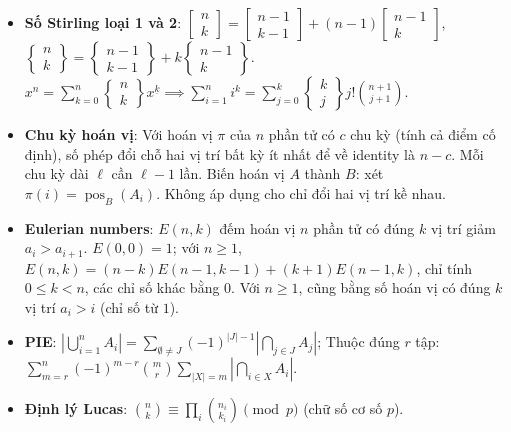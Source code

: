 \begin{itemize}
    \item \textbf{Số Stirling loại 1 và 2}: $\left[ \begin{matrix} n \\ k \end{matrix} \right] = \left[ \begin{matrix} n-1 \\ k-1 \end{matrix} \right] + (n-1) \left[ \begin{matrix} n-1 \\ k \end{matrix} \right]$, $\left\{ \begin{matrix} n \\ k \end{matrix} \right\} = \left\{ \begin{matrix} n-1 \\ k-1 \end{matrix} \right\} + k \left\{ \begin{matrix} n-1 \\ k \end{matrix} \right\}$.
    $x^n = \sum_{k=0}^n \left\{ \begin{matrix} n \\ k \end{matrix} \right\} x^{\underline{k}} \implies \sum_{i=1}^n i^k = \sum_{j=0}^k \left\{ \begin{matrix} k \\ j \end{matrix} \right\} j! \binom{n + 1}{j + 1}$.
    \item \textbf{Chu kỳ hoán vị}: Với hoán vị $\pi$ của $n$ phần tử có $c$ chu kỳ (tính cả điểm cố định), số phép đổi chỗ hai vị trí bất kỳ ít nhất để về identity là $n-c$. Mỗi chu kỳ dài $\ell$ cần $\ell-1$ lần. Biến hoán vị $A$ thành $B$: xét $\pi(i)=\operatorname{pos}_B(A_i)$. Không áp dụng cho chỉ đổi hai vị trí kề nhau.
    \item \textbf{Eulerian numbers}: $E(n,k)$ đếm hoán vị $n$ phần tử có đúng $k$ vị trí giảm $a_i>a_{i+1}$. $E(0,0)=1$; với $n\ge1$, $E(n,k)=(n-k)E(n-1,k-1)+(k+1)E(n-1,k)$, chỉ tính $0\le k<n$, các chỉ số khác bằng $0$. Với $n\ge1$, cũng bằng số hoán vị có đúng $k$ vị trí $a_i>i$ (chỉ số từ $1$).
    \item \textbf{PIE}: $|\bigcup_{i=1}^n A_i| = \sum_{\emptyset \ne J} (-1)^{|J|-1} |\bigcap_{j \in J} A_j|$; Thuộc đúng $r$ tập: $\sum_{m=r}^n (-1)^{m-r} \binom{m}{r} \sum_{|X|=m} |\bigcap_{i \in X} A_i|$.
    \item \textbf{Định lý Lucas}: $\binom{n}{k} \equiv \prod_{i} \binom{n_i}{k_i} \pmod p$ (chữ số cơ số $p$).

\end{itemize}
